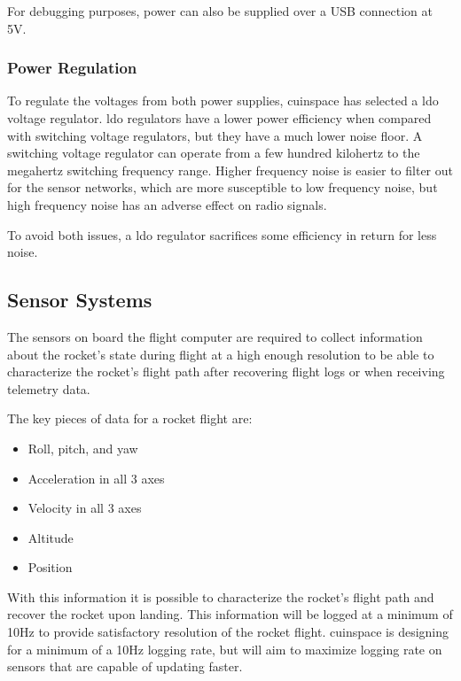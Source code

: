 For debugging purposes, power can also be supplied over a USB connection at 5V.

\subsubsection{Power Regulation}

To regulate the voltages from both power supplies, \gls{cuinspace} has selected a \gls{ldo} voltage regulator.
\Gls{ldo} regulators have a lower power efficiency when compared with switching voltage regulators, but they have a
much lower noise floor. A switching voltage regulator can operate from a few hundred kilohertz to the megahertz
switching frequency range. Higher frequency noise is easier to filter out for the sensor networks, which are more
susceptible to low frequency noise, but high frequency noise has an adverse effect on radio signals.

To avoid both issues, a \gls{ldo} regulator sacrifices some efficiency in return for less noise.

\subsection{Sensor Systems}

The sensors on board the flight computer are required to collect information about the rocket's state during flight at
a high enough resolution to be able to characterize the rocket's flight path after recovering flight logs or when
receiving telemetry data.

The key pieces of data for a rocket flight are:

\begin{itemize}
    \item Roll, pitch, and yaw
    \item Acceleration in all 3 axes
    \item Velocity in all 3 axes
    \item Altitude
    \item Position
\end{itemize}

With this information it is possible to characterize the rocket's flight path and recover the rocket upon landing. This
information will be logged at a minimum of 10Hz to provide satisfactory resolution of the rocket flight.
\gls{cuinspace} is designing for a minimum of a 10Hz logging rate, but will aim to maximize logging rate on sensors
that are capable of updating faster.

